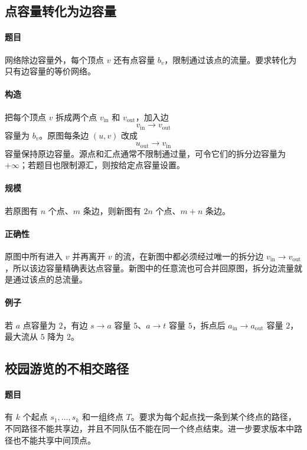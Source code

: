 \documentclass[UTF8,openany,12pt]{ctexbook}
\theoremstyle{remark}
\begin{document}
\subsection{点容量转化为边容量}

\paragraph{题目}
网络除边容量外，每个顶点 $v$ 还有点容量 $b_v$，限制通过该点的流量。要求转化为只有边容量的等价网络。

\paragraph{构造}
把每个顶点 $v$ 拆成两个点 $v_{\mathrm{in}}$ 和 $v_{\mathrm{out}}$，加入边
\[
  v_{\mathrm{in}}\to v_{\mathrm{out}}
\]
容量为 $b_v$。原图每条边 $(u,v)$ 改成
\[
  u_{\mathrm{out}}\to v_{\mathrm{in}}
\]
容量保持原边容量。源点和汇点通常不限制通过量，可令它们的拆分边容量为 $+\infty$；若题目也限制源汇，则按给定点容量设置。

\paragraph{规模}
若原图有 $n$ 个点、$m$ 条边，则新图有 $2n$ 个点、$m+n$ 条边。

\paragraph{正确性}
原图中所有进入 $v$ 并再离开 $v$ 的流，在新图中都必须经过唯一的拆分边
$v_{\mathrm{in}}\to v_{\mathrm{out}}$，所以该边容量精确表达点容量。新图中的任意流也可合并回原图，拆分边流量就是通过该点的总流量。

\paragraph{例子}
若 $a$ 点容量为 $2$，有边 $s\to a$ 容量 $5$、$a\to t$ 容量 $5$，拆点后
$a_{\mathrm{in}}\to a_{\mathrm{out}}$ 容量 $2$，最大流从 $5$ 降为 $2$。

\subsection{校园游览的不相交路径}

\paragraph{题目}
有 $k$ 个起点 $s_1,\dots,s_k$ 和一组终点 $T$。要求为每个起点找一条到某个终点的路径，
不同路径不能共享边，并且不同队伍不能在同一个终点结束。进一步要求版本中路径也不能共享中间顶点。
\end{document}
